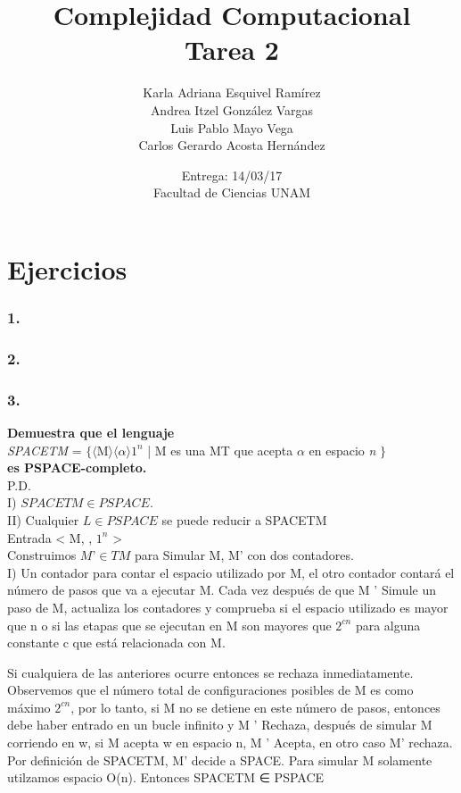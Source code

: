 \documentclass[12pt]{article}
\title{Complejidad Computacional \\ Tarea 2}
\author{Karla Adriana Esquivel Ramírez \\ Andrea Itzel González Vargas\\ Luis Pablo Mayo Vega \\ Carlos Gerardo Acosta Hernández}
\date{Entrega: 14/03/17 \\ Facultad de Ciencias UNAM}
\begin{document}
\maketitle
\section*{Ejercicios}

\subsubsection*{1.}

\subsubsection*{2.}

\subsubsection*{3.}
\textbf{Demuestra que el lenguaje} \\
\indent \textit{SPACETM} = $\{ \langle$M$\rangle \langle \alpha 
\rangle 1^n$ | M es una MT que acepta $\alpha$ en espacio \textit{n} $\}$ \\
\textbf{es PSPACE-completo.} \\

 P.D.\\


I) $SPACETM \in PSPACE.$\\

II) Cualquier $L \in PSPACE$ se puede reducir a SPACETM\\
 
Entrada < M, \alpha, $1^{n}$ >\\

Construimos $M’\in TM$ para Simular M, M’ con dos contadores. \\

I) Un contador para contar el espacio utilizado por M, el otro contador contará el número de pasos que va a ejecutar M. Cada vez después de que M ' Simule un paso de M, actualiza los contadores y comprueba si el espacio utilizado 
es mayor que n o si las etapas que se ejecutan en M son mayores que $2^{cn}$  para alguna constante c que está relacionada con M. 

Si cualquiera de las anteriores ocurre entonces se rechaza inmediatamente.  Observemos que el número total de configuraciones posibles de M es como máximo $2^{cn}$, por lo tanto, si M no se detiene en este número de pasos, entonces debe haber entrado en un bucle infinito y M ' Rechaza, después de simular M corriendo en w, si M acepta w en espacio n, M ' Acepta, en otro caso M’ rechaza.
Por definición de SPACETM, M’ decide a SPACE. Para simular M solamente utilzamos espacio O(n). Entonces SPACETM ∈ PSPACE\\
\end{document}
